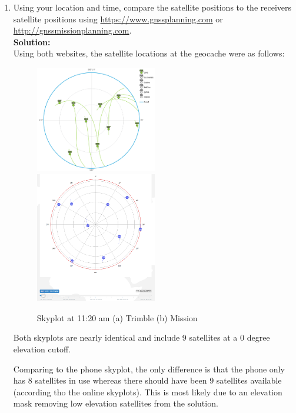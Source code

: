 \documentclass[11pt]{article}
\newcommand{\solution}{\textbf{\\Solution: \\}}
\begin{document}
\begin{enumerate}[label=\textbf{\arabic*.}]
  \item  Using your location and time, compare the satellite positions to the 
  receivers satellite positions using \url{https://www.gnssplanning.com} or
  \url{http://gnssmissionplanning.com}. 
  \solution
  Using both websites, the satellite locations at the geocache were as 
  follows:
  \begin{figure}[H]
    \centering
    \includegraphics[width=0.5\textwidth]{trimble_sky_1120.png}
    \includegraphics[width=0.5\textwidth]{mission_sky_1120.png}
    \caption{Skyplot at 11:20 am (a) Trimble (b) Mission}
  \end{figure}
  Both skyplots are nearly identical and include 9 satellites at a 0 degree 
  elevation cutoff.

  Comparing to the phone skyplot, the only difference is that the phone 
  only has 8 satellites in use whereas there should have been 9 satellites 
  available (according tho the online skyplots). This is most likely due 
  to an elevation mask removing low elevation satellites from the solution.


\end{enumerate}
\end{document}
